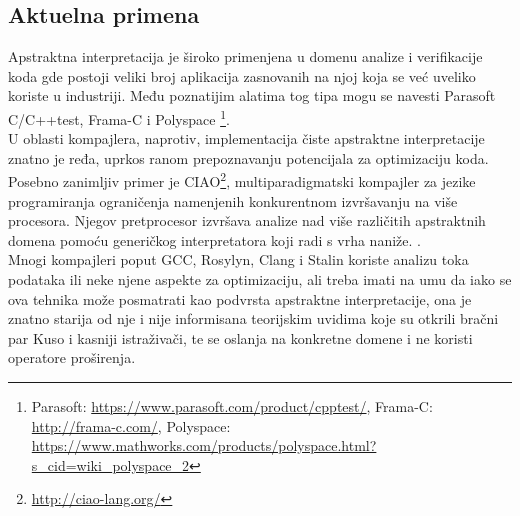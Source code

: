 \subsection{Aktuelna primena}
Apstraktna interpretacija je široko primenjena u domenu analize i verifikacije koda gde postoji veliki broj aplikacija zasnovanih na njoj koja se već uveliko koriste u industriji\cite{Wilhelm-Wachter}. Među poznatijim alatima tog tipa mogu se navesti Parasoft C/C++test, Frama-C i Polyspace \footnote{Parasoft: \url{https://www.parasoft.com/product/cpptest/}, Frama-C: \url{http://frama-c.com/}, Polyspace: \url{https://www.mathworks.com/products/polyspace.html?s_cid=wiki_polyspace_2}}. \\

U oblasti kompajlera, naprotiv, implementacija čiste apstraktne interpretacije znatno je ređa, uprkos ranom prepoznavanju potencijala za optimizaciju koda\cite{cousot}. 	Posebno zanimljiv primer je CIAO\footnote{\url{http://ciao-lang.org/}}, multiparadigmatski kompajler za jezike programiranja ograničenja namenjenih konkurentnom izvršavanju na više procesora. Njegov pretprocesor izvršava analize nad više različitih apstraktnih domena pomoću generičkog interpretatora koji radi 	s vrha naniže. \cite{ciao-report}. \\

Mnogi kompajleri poput GCC, Rosylyn, Clang i Stalin koriste analizu toka podataka ili neke njene aspekte za optimizaciju, ali treba imati na umu da iako se ova tehnika može posmatrati kao podvrsta apstraktne interpretacije, ona je znatno starija od nje i nije informisana teorijskim uvidima koje su otkrili bračni par Kuso i kasniji istraživači, te se oslanja na konkretne domene i ne koristi operatore proširenja.



